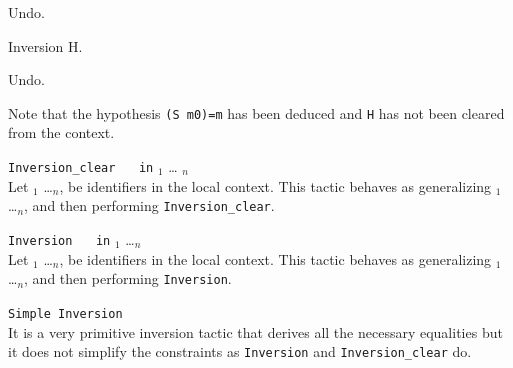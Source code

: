 \begin{itemize}
\begin{coq_example*}
Undo.
\end{coq_example*}
\begin{coq_example}
Inversion H.
\end{coq_example}

\begin{coq_eval}
Undo.
\end{coq_eval}

Note that the hypothesis \texttt{(S m0)=m} has been deduced and 
\texttt{H} has not been cleared from the context.

\end{itemize}

\begin{Variants}

\item \texttt{Inversion\_clear } \ident~ \texttt{in} \ident$_1$ \ldots
  \ident$_n$\\ 
  Let \ident$_1$ \ldots \ident$_n$, be identifiers in the local context. This
  tactic behaves as generalizing \ident$_1$ \ldots \ident$_n$, and then performing
  {\tt Inversion\_clear}.

\item \texttt{Inversion } \ident~ \texttt{in} \ident$_1$ \ldots \ident$_n$\\
  Let \ident$_1$ \ldots \ident$_n$, be identifiers in the local context. This
  tactic behaves as generalizing \ident$_1$ \ldots \ident$_n$, and then performing
  \texttt{Inversion}.


\item \texttt{Simple Inversion} \ident~ \\
  It is a very primitive inversion tactic that derives all the necessary
  equalities  but it does not simplify
  the  constraints as \texttt{Inversion} and
  {\tt Inversion\_clear} do.

\end{Variants}


